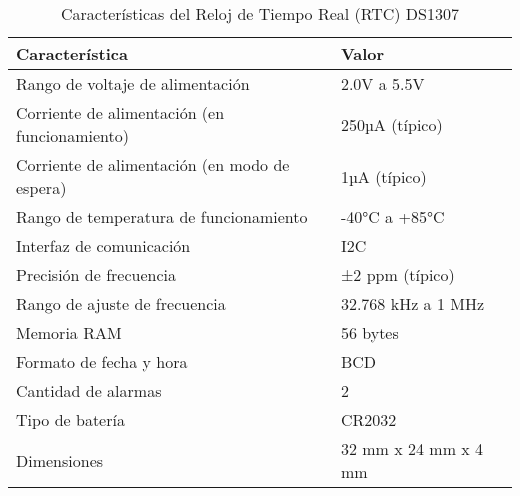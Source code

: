 \begin{table}[H]
\centering
\caption{Características del Reloj de Tiempo Real (RTC) DS1307}
\label{tab:rtc_ds1307_caracteristicas}
\begin{tabular}{|l|l|}
\hline
\textbf{Característica}                              & \textbf{Valor}                       \\ \hline
Rango de voltaje de alimentación                     & 2.0V a 5.5V                          \\ \hline
Corriente de alimentación (en funcionamiento)        & 250µA (típico)                       \\ \hline
Corriente de alimentación (en modo de espera)        & 1µA (típico)                         \\ \hline
Rango de temperatura de funcionamiento               & -40°C a +85°C                        \\ \hline
Interfaz de comunicación                             & I2C                                  \\ \hline
Precisión de frecuencia                              & ±2 ppm (típico)                      \\ \hline
Rango de ajuste de frecuencia                        & 32.768 kHz a 1 MHz                   \\ \hline
Memoria RAM                                          & 56 bytes                             \\ \hline
Formato de fecha y hora                              & BCD                                  \\ \hline
Cantidad de alarmas                                  & 2                                    \\ \hline
Tipo de batería                                      & CR2032                \\ \hline
Dimensiones                                          & 32 mm x 24 mm x 4 mm                 \\ \hline
\end{tabular}
\end{table}
